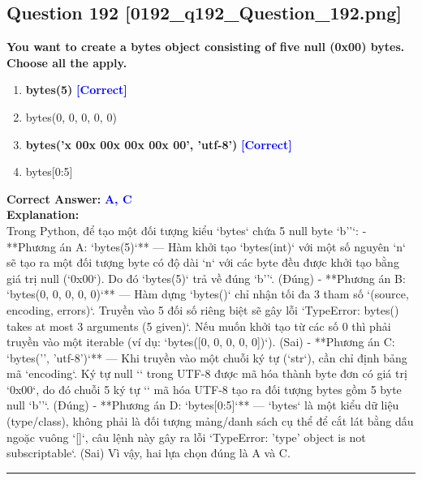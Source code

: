 \documentclass[11pt,a4paper]{article}
\begin{document}
\begin{minipage}{\textwidth}
\subsection*{Question 192 \quad \footnotesize{[0192_q192_Question_192.png]}}
\noindent \textbf{You want to create a bytes object consisting of five null (0x00) bytes. Choose all the apply.}

\begin{enumerate}[label=\Alph*.]
    \item \textbf{bytes(5)} \hfill \textcolor{blue}{\textbf{[Correct]}}
    \item bytes(0, 0, 0, 0, 0)
    \item \textbf{bytes('x 00x 00x 00x 00x 00', 'utf-8')} \hfill \textcolor{blue}{\textbf{[Correct]}}
    \item bytes[0:5]
\end{enumerate}

\noindent \textbf{Correct Answer:} \textcolor{blue}{\textbf{A, C}} \\[4pt]
\noindent \textbf{Explanation:}\\
Trong Python, để tạo một đối tượng kiểu `bytes` chứa 5 null byte `b''`:\newline
- **Phương án A: `bytes(5)`** — Hàm khởi tạo `bytes(int)` với một số nguyên `n` sẽ tạo ra một đối tượng byte có độ dài `n` với các byte đều được khởi tạo bằng giá trị null (`0x00`). Do đó `bytes(5)` trả về đúng `b''`. (Đúng)\newline
- **Phương án B: `bytes(0, 0, 0, 0, 0)`** — Hàm dựng `bytes()` chỉ nhận tối đa 3 tham số `(source, encoding, errors)`. Truyền vào 5 đối số riêng biệt sẽ gây lỗi `TypeError: bytes() takes at most 3 arguments (5 given)`. Nếu muốn khởi tạo từ các số 0 thì phải truyền vào một iterable (ví dụ: `bytes([0, 0, 0, 0, 0])`). (Sai)\newline
- **Phương án C: `bytes('', 'utf-8')`** — Khi truyền vào một chuỗi ký tự (`str`), cần chỉ định bảng mã `encoding`. Ký tự null `` trong UTF-8 được mã hóa thành byte đơn có giá trị `0x00`, do đó chuỗi 5 ký tự `` mã hóa UTF-8 tạo ra đối tượng bytes gồm 5 byte null `b''`. (Đúng)\newline
- **Phương án D: `bytes[0:5]`** — `bytes` là một kiểu dữ liệu (type/class), không phải là đối tượng mảng/danh sách cụ thể để cắt lát bằng dấu ngoặc vuông `[]`, câu lệnh này gây ra lỗi `TypeError: 'type' object is not subscriptable`. (Sai)\newline
Vì vậy, hai lựa chọn đúng là A và C.
\end{minipage}
\vspace{0.8cm}
\hrule
\vspace{0.5cm}
\end{document}
